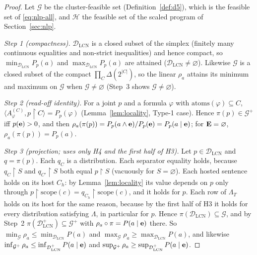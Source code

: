 \documentclass{article} %
\newcommand{\DLCN}{\mathcal{D}_{\mathrm{LCN}}}
\newcommand{\atoms}{\mathrm{atoms}}
\newcommand{\restr}{\!\restriction\!}
\newcommand{\readoff}{\rho}
\newcommand{\scope}{\mathrm{scope}}
\begin{document}
\begin{proof}
Let $\mathcal G$ be the cluster-feasible set (Definition~\ref{def:d5}), which is the
feasible set of \eqref{eq:nlp-all}, and $\mathcal H$ the feasible set of the scaled
program of Section~\ref{sec:nlp}.

\emph{Step 1 (compactness).} $\DLCN$ is a closed subset of the simplex (finitely
many continuous equalities and non-strict inequalities) and hence compact, so
$\min_{\DLCN}P_p(a)$ and $\max_{\DLCN}P_p(a)$ are attained ($\DLCN\neq\varnothing$).
Likewise $\mathcal G$ is a closed subset of the compact $\prod_C\Delta(2^{|C|})$, so
the linear $\readoff_a$ attains its minimum and maximum on $\mathcal G$ when
$\mathcal G\neq\varnothing$ (Step~3 shows $\mathcal G\neq\varnothing$).

\emph{Step 2 (read-off identity).} For a joint $p$ and a formula $\varphi$ with
$\atoms(\varphi)\subseteq C$, $\langle A^{(C)}_\varphi,p\restr C\rangle=P_p(\varphi)$
(Lemma~\ref{lem:locality}, Type-1 case). Hence $\pi(p)\in\mathcal G^+$ iff
$p(\mathbf{e})>0$, and then $\readoff_a(\pi(p))=P_p(a\wedge\be)/P_p(\be)=P_p(a\mid\be)$;
for $\mathbf{E}=\varnothing$, $\readoff_a(\pi(p))=P_p(a)$.

\emph{Step 3 (projection; uses only H4 and the first half of H3).} Let
$p\in\DLCN$ and $q=\pi(p)$. Each $q_C$ is a distribution. Each separator equality
holds, because $q_C\restr S$ and $q_{C'}\restr S$ both equal $p\restr S$ (vacuously
for $S=\varnothing$). Each hosted sentence holds on its host $C_h$: by
Lemma~\ref{lem:locality} its value depends on $p$ only through
$p\restr\scope(c)=q_{C_h}\restr\scope(c)$, and it holds for $p$. Each row of
$\Lambda_T$ holds on its host for the same reason, because by the first half of H3
it holds for every distribution satisfying $\Lambda$, in particular for $p$. Hence
$\pi(\DLCN)\subseteq\mathcal G$, and by Step~2 $\pi(\DLCN^+)\subseteq\mathcal G^+$
with $\readoff_a\circ\pi=P(a\mid\be)$ there. So
$\min_{\mathcal G}\readoff_a\le\min_{\DLCN}P(a)$ and
$\max_{\mathcal G}\readoff_a\ge\max_{\DLCN}P(a)$, and likewise
$\inf_{\mathcal G^+}\readoff_a\le\inf_{\DLCN^+}P(a\mid\be)$ and
$\sup_{\mathcal G^+}\readoff_a\ge\sup_{\DLCN^+}P(a\mid\be)$.


\end{proof}
\end{document}
